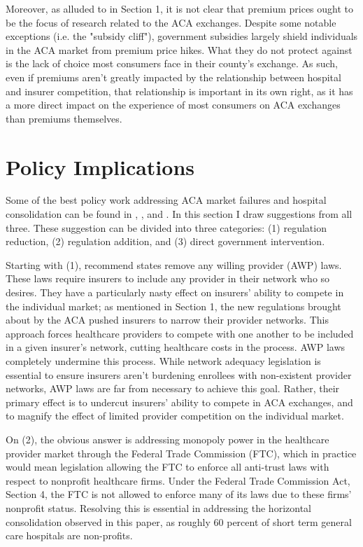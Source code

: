 \documentclass[12pt,letterpaper]{article}
\begin{document}
Moreover, as alluded to in Section 1, it is not clear that premium prices ought to be the focus of research related to the ACA exchanges. Despite some notable exceptions (i.e. the "subsidy cliff"), government subsidies largely shield individuals in the ACA market from premium price hikes. What they do not protect against is the lack of choice most consumers face in their county's exchange. As such, even if premiums aren't greatly impacted by the relationship between hospital and insurer competition, that relationship is important in its own right, as it has a more direct impact on the experience of most consumers on ACA exchanges than premiums themselves. 

\section{Policy Implications}

Some of the best policy work addressing ACA market failures and hospital consolidation can be found in \citet{berenson_addressing_2015}, \citet{gaynor_making_2017}, and \citet{fiedler_capping_2020}. In this section I draw suggestions from all three. These suggestion can be divided into three categories: (1) regulation reduction, (2) regulation addition, and (3) direct government intervention. 

Starting with (1), \citet{gaynor_making_2017} recommend states remove any willing provider (AWP) laws. These laws require insurers to include any provider in their network who so desires. They have a particularly nasty effect on insurers' ability to compete in the individual market; as mentioned in Section 1, the new regulations brought about by the ACA pushed insurers to narrow their provider networks. This approach forces healthcare providers to compete with one another to be included in a given insurer's network, cutting healthcare costs in the process. AWP laws completely undermine this process. While network adequacy legislation is essential to ensure insurers aren't burdening enrollees with non-existent provider networks, AWP laws are far from necessary to achieve this goal. Rather, their primary effect is to undercut insurers' ability to compete in ACA exchanges, and to magnify the effect of limited provider competition on the individual market.

On (2), the obvious answer is addressing monopoly power in the healthcare provider market through the Federal Trade Commission (FTC), which in practice would mean legislation allowing the FTC to enforce all anti-trust laws with respect to nonprofit healthcare firms. Under the Federal Trade Commission Act, Section 4, the FTC is not allowed to enforce many of its laws due to these firms' nonprofit status. Resolving this is essential in addressing the horizontal consolidation observed in this paper, as roughly 60 percent of short term general care hospitals are non-profits. 
\end{document}
